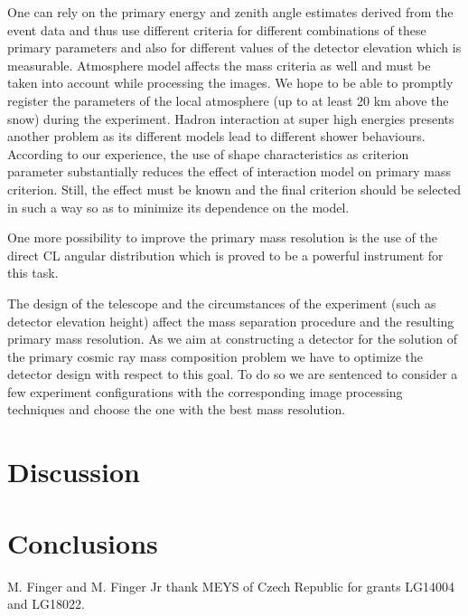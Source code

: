 \documentclass[a4paper,11pt]{article}
\begin{document}
One can rely on the primary energy and zenith angle estimates derived from the event data and thus use different criteria for different combinations of these primary parameters and also for different values of the detector elevation which is measurable. Atmosphere model affects the mass criteria as well and must be taken into account while processing the images.
We hope to be able to promptly register the parameters of the local atmosphere (up to at least 20 km above the snow) during the experiment. Hadron interaction at super high energies presents another problem as its different models lead to different shower behaviours. According to our experience, the use of shape characteristics as criterion parameter substantially reduces the effect of interaction model on primary mass criterion. Still, the effect must be known and the final criterion should be selected in such a way so as to minimize its dependence on the model.

One more possibility to improve the primary mass resolution is the use of the direct CL angular distribution which is proved to be a powerful instrument for this task\cite{Gal18a}.

The design of the telescope and the circumstances of the experiment (such as detector elevation height) affect the mass separation procedure and the resulting primary mass resolution. As we aim at constructing a detector for the solution of the primary cosmic ray mass composition problem we have to optimize the detector design with respect to this goal. To do so we are sentenced to consider a few experiment configurations with the corresponding image processing techniques and choose the one with the best mass resolution.


\section{Discussion}

\section{Conclusions}

\acknowledgments
{}
M. Finger and M. Finger Jr thank MEYS of Czech Republic for grants LG14004 and LG18022.



\end{document}
